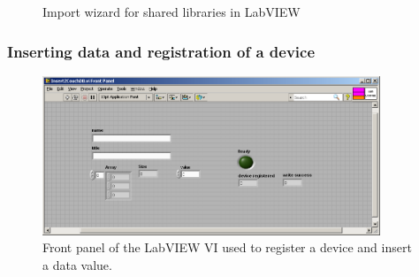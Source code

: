 \begin{figure}[h!]
	\centering
	\caption{Import wizard for shared libraries in LabVIEW}
	\label{figure:ImportWizard}
\end{figure}

\subsubsection{Inserting data and registration of a device}
 
\begin{figure}[h!]
  \centering
      \includegraphics[width=0.9\textwidth]{images/InsertValue2CouchDBfront.png}
  \caption{Front panel of the LabVIEW VI used to register a device and insert a data value.}
  \label{figure:InsertValue2CouchDBfront}
\end{figure}

